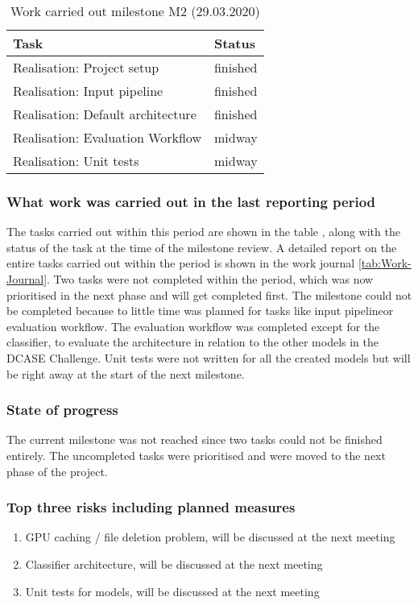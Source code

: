 \begin{table}[htbp]
    \centering
    \caption{Work carried out milestone M2 (29.03.2020)}
	\label{tab:Work-Carried-Out-M2}
    \begin{tabular}{p{} | p{}}
        \toprule
        \textbf{Task} & \textbf{Status} \\ 
        \midrule[1pt]
        Realisation: Project setup & finished \\
        \hline
        Realisation: Input pipeline & finished \\
        \hline
        Realisation: Default architecture & finished \\
        \hline
        Realisation: Evaluation Workflow & midway \\
        \hline
        Realisation: Unit tests & midway \\
        \bottomrule
    \end{tabular}
\end{table}

\subsubsection{What work was carried out in the last reporting period}
The tasks carried out within this period are shown in the table , along with the status of the task at the time of the milestone review. A detailed report on the entire tasks carried out within the period is shown in the work journal \ref{tab:Work-Journal}. Two tasks were not completed within the period, which was now prioritised in the next phase and will get completed first. The milestone could not be completed because to little time was planned for tasks like \flqq input pipeline\frqq or \flqq evaluation workflow\frqq. The evaluation workflow was completed except for the classifier, to evaluate the architecture in relation to the other models in the DCASE Challenge. Unit tests were not written for all the created models but will be right away at the start of the next milestone.

\subsubsection{State of progress}
The current milestone was not reached since two tasks could not be finished entirely. The uncompleted tasks were prioritised and were moved to the next phase of the project.

\subsubsection{Top three risks including planned measures}
\begin{enumerate}
    \setlength\itemsep{0em}
    \item GPU caching / file deletion problem, will be discussed at the next meeting
    \item Classifier architecture, will be discussed at the next meeting
    \item Unit tests for models, will be discussed at the next meeting 
\end{enumerate}

